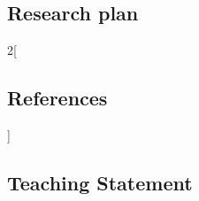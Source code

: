 \documentclass{cv}
\newcommand\urlprefix{}
\begin{document}
\begin{Research} %
\newpage

\makeatletter
\makeatother
\section{Research plan}

\begin{bibunit}[cv-ref]
\begin{indented}



\end{indented}


\setlength{\columnsep}{0pt}
\begin{multicols}{2}[\subsection*{References}]
\footnotesize
\raggedright
\makeatletter
\renewenvironment{thebibliography}[1]
     {\list{\@biblabel{\@arabic\c@enumiv}}%
           {\settowidth\labelwidth{\@biblabel{#1}}%
            \addtolength\labelwidth{2em}%
            \leftmargin\labelwidth
            \setlength{\labelsep}{1pt}%
            \setlength{\itemsep}{0pt}%
            \setlength{\parsep}{2pt plus 1pt}%
            \@openbib@code
            \usecounter{enumiv}%
            \let\p@enumiv\@empty
            \renewcommand\theenumiv{\@arabic\c@enumiv}}%
      \sloppy
      \clubpenalty4000
      \@clubpenalty \clubpenalty
      \widowpenalty4000%
      \sfcode`\.\@m}
     {\def\@noitemerr
       {\@latex@warning{Empty `thebibliography' environment}}%
      \endlist}
\makeatother
\renewcommand{\theenumi}{\arabic{enumi}}
\renewcommand{\labelenumi}{[\theenumi]}
\renewcommand\bibitem\oldbibitem
\renewcommand\urlprefix{}
\end{multicols}
\end{bibunit}

\end{Research}

\begin{Research}

\newpage
\section{Teaching Statement}
\begin{indented}



\end{indented}

\end{Research}
\end{document}

